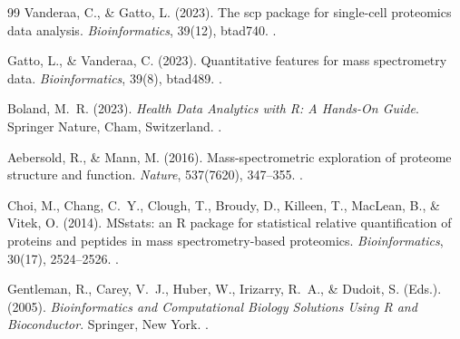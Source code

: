 \documentclass[11pt,twoside,openright]{book}
\begin{document}
\begin{thebibliography}{99}
Vanderaa, C., \& Gatto, L. (2023). The scp package for single-cell proteomics data analysis. \textit{Bioinformatics}, 39(12), btad740. .

Gatto, L., \& Vanderaa, C. (2023). Quantitative features for mass spectrometry data. \textit{Bioinformatics}, 39(8), btad489. .

Boland, M.~R. (2023). \textit{Health Data Analytics with R: A Hands-On Guide}. Springer Nature, Cham, Switzerland. .

Aebersold, R., \& Mann, M. (2016). Mass-spectrometric exploration of proteome structure and function. \textit{Nature}, 537(7620), 347--355. .

Choi, M., Chang, C.~Y., Clough, T., Broudy, D., Killeen, T., MacLean, B., \& Vitek, O. (2014). MSstats: an R package for statistical relative quantification of proteins and peptides in mass spectrometry-based proteomics. \textit{Bioinformatics}, 30(17), 2524--2526. .

Gentleman, R., Carey, V.~J., Huber, W., Irizarry, R.~A., \& Dudoit, S. (Eds.). (2005). \textit{Bioinformatics and Computational Biology Solutions Using R and Bioconductor}. Springer, New York. .

\end{thebibliography}
\end{document}
